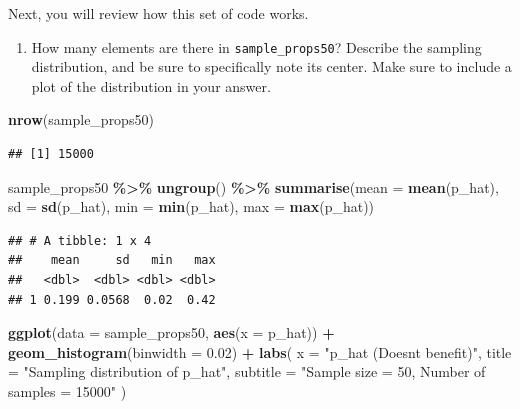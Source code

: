 \documentclass[
]{article}
\newenvironment{Shaded}{\begin{snugshade}}{\end{snugshade}}
\newcommand{\AttributeTok}[1]{\textcolor[rgb]{0.13,0.29,0.53}{#1}}
\newcommand{\FloatTok}[1]{\textcolor[rgb]{0.00,0.00,0.81}{#1}}
\newcommand{\FunctionTok}[1]{\textcolor[rgb]{0.13,0.29,0.53}{\textbf{#1}}}
\newcommand{\NormalTok}[1]{#1}
\newcommand{\SpecialCharTok}[1]{\textcolor[rgb]{0.81,0.36,0.00}{\textbf{#1}}}
\newcommand{\StringTok}[1]{\textcolor[rgb]{0.31,0.60,0.02}{#1}}
\providecommand{\tightlist}{%
  \setlength{\itemsep}{0pt}\setlength{\parskip}{0pt}}
\begin{document}
Next, you will review how this set of code works.

\begin{enumerate}
\def\labelenumi{\arabic{enumi}.}
\setcounter{enumi}{3}
\tightlist
\item
  How many elements are there in \texttt{sample\_props50}? Describe the
  sampling distribution, and be sure to specifically note its center.
  Make sure to include a plot of the distribution in your answer.
\end{enumerate}

\begin{Shaded}
\begin{Highlighting}[]
\FunctionTok{nrow}\NormalTok{(sample\_props50)}
\end{Highlighting}
\end{Shaded}

\begin{verbatim}
## [1] 15000
\end{verbatim}

\begin{Shaded}
\begin{Highlighting}[]
\NormalTok{sample\_props50 }\SpecialCharTok{\%\textgreater{}\%}
  \FunctionTok{ungroup}\NormalTok{() }\SpecialCharTok{\%\textgreater{}\%}
  \FunctionTok{summarise}\NormalTok{(}\AttributeTok{mean =} \FunctionTok{mean}\NormalTok{(p\_hat), }\AttributeTok{sd =} \FunctionTok{sd}\NormalTok{(p\_hat), }\AttributeTok{min =} \FunctionTok{min}\NormalTok{(p\_hat), }\AttributeTok{max =} \FunctionTok{max}\NormalTok{(p\_hat))}
\end{Highlighting}
\end{Shaded}

\begin{verbatim}
## # A tibble: 1 x 4
##    mean     sd   min   max
##   <dbl>  <dbl> <dbl> <dbl>
## 1 0.199 0.0568  0.02  0.42
\end{verbatim}

\begin{Shaded}
\begin{Highlighting}[]
\FunctionTok{ggplot}\NormalTok{(}\AttributeTok{data =}\NormalTok{ sample\_props50, }\FunctionTok{aes}\NormalTok{(}\AttributeTok{x =}\NormalTok{ p\_hat)) }\SpecialCharTok{+}
  \FunctionTok{geom\_histogram}\NormalTok{(}\AttributeTok{binwidth =} \FloatTok{0.02}\NormalTok{) }\SpecialCharTok{+}
  \FunctionTok{labs}\NormalTok{(}
    \AttributeTok{x =} \StringTok{"p\_hat (Doesn\textquotesingle{}t benefit)"}\NormalTok{,}
    \AttributeTok{title =} \StringTok{"Sampling distribution of p\_hat"}\NormalTok{,}
    \AttributeTok{subtitle =} \StringTok{"Sample size = 50, Number of samples = 15000"}
\NormalTok{  )}
\end{Highlighting}
\end{Shaded}
\end{document}
